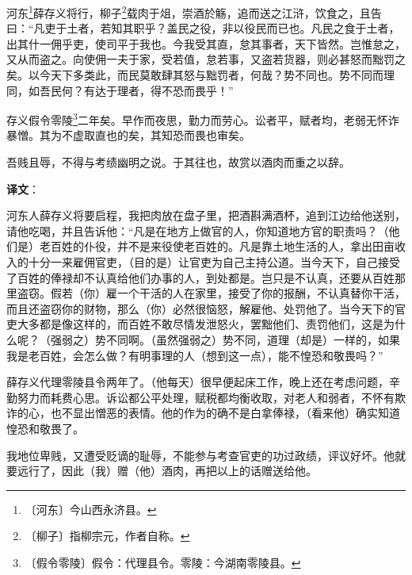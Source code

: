 \documentclass[12pt,UTF-8,openany,a4]{ctexbook}
\begin{document}
\begin{large}
    
    河东\footnote{〔河东〕\yiwen 今山西永济县。}薛存义将行，柳子\footnote{〔柳子〕\yiwen 指柳宗元，作者自称。}载肉于俎，崇酒於觞，追而送之江浒，饮食之，且告曰：“凡吏于土者，若知其职乎？盖民之役，非以役民而已也。凡民之食于土者，出其什一佣乎吏，使司平于我也。今我受其直，怠其事者，天下皆然。岂惟怠之，又从而盗之。向使佣一夫于家，受若值，怠若事，又盗若货器，则必甚怒而黜罚之矣。以今天下多类此，而民莫敢肆其怒与黜罚者，何哉？势不同也。势不同而理同，如吾民何？有达于理者，得不恐而畏乎！”
    
    存义假令零陵\footnote{〔假令零陵〕\yiwen 假令：代理县令。零陵：今湖南零陵县。}二年矣。早作而夜思，勤力而劳心。讼者平，赋者均，老弱无怀诈暴憎。其为不虚取直也的矣，其知恐而畏也审矣。
    
    吾贱且辱，不得与考绩幽明之说。于其往也，故赏以酒肉而重之以辞。

\end{large}


\newpage

\begin{Large}
   \noindent \textbf{译文}：
\end{Large}

\vspace{1em}

\begin{large}\yiwen
    
    河东人薛存义将要启程，我把肉放在盘子里，把酒斟满酒杯，追到江边给他送别，请他吃喝，并且告诉他：“凡是在地方上做官的人，你知道地方官的职责吗？（他们是）老百姓的仆役，并不是来役使老百姓的。凡是靠土地生活的人，拿出田亩收入的十分一来雇佣官吏，（目的是）让官吏为自己主持公道。当今天下，自己接受了百姓的俸禄却不认真给他们办事的人，到处都是。岂只是不认真，还要从百姓那里盗窃。假若（你）雇一个干活的人在家里，接受了你的报酬，不认真替你干活，而且还盗窃你的财物，那么（你）必然很恼怒，解雇他、处罚他了。当今天下的官吏大多都是像这样的，而百姓不敢尽情发泄怒火，罢黜他们、责罚他们，这是为什么呢？（强弱之）势不同啊。（虽然强弱之）势不同，道理（却是）一样的，如果我是老百姓，会怎么做？有明事理的人（想到这一点），能不惶恐和敬畏吗？”
    
    薛存义代理零陵县令两年了。（他每天）很早便起床工作，晚上还在考虑问题，辛勤努力而耗费心思。诉讼都公平处理，赋税都均衡收取，对老人和弱者，不怀有欺诈的心，也不显出憎恶的表情。他的作为的确不是白拿俸禄，（看来他）确实知道惶恐和敬畏了。
    
    我地位卑贱，又遭受贬谪的耻辱，不能参与考查官吏的功过政绩，评议好坏。他就要远行了，因此（我）赠（他）酒肉，再把以上的话赠送给他。
    

\end{large}
\end{document}
